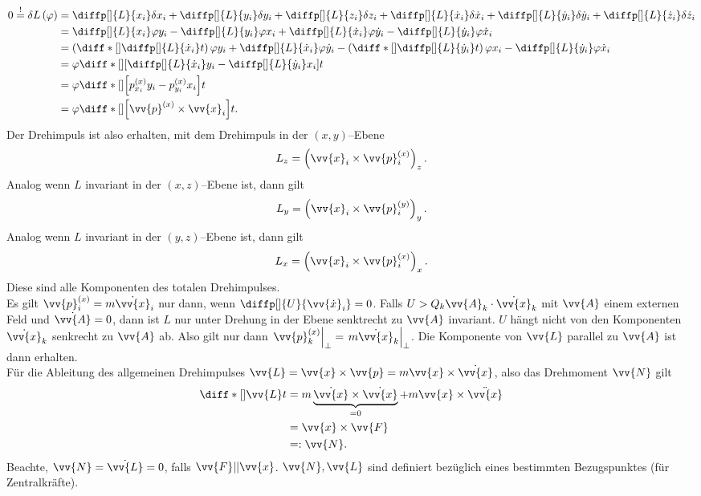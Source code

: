 \documentclass[a4paper,12pt]{article}
\numberwithin{equation}{section}
\begin{document}
\begin{align*}
        0\stackrel{!}{=}\delta L\left(\varphi \right)&=\diffp[]{L}{x_i}\delta x_i+\diffp[]{L}{y_i}\delta y_i+\diffp[]{L}{z_i}\delta z_i+\diffp[]{L}{\dot{x}_i}\delta \dot{x}_i +\diffp[]{L}{\dot{y}_i}\delta \dot{y}_i+\diffp[]{L}{\dot{z}_i}\delta \dot{z}_i\\
                                                     &=\diffp[]{L}{x_i}\varphi y_i-\diffp[]{L}{y_i}\varphi x_i+\diffp[]{L}{\dot{x}_i}\varphi \dot{y}_i-\diffp[]{L}{\dot{y}_i}\varphi \dot{x}_i\\
                                                     &=\left(\diff*[]{\diffp[]{L}{\dot{x}_i}}{t}\right)\varphi y_i+\diffp[]{L}{\dot{x}_i}\varphi \dot{y}_i-\left(\diff*[]{\diffp[]{L}{\dot{y}_i}}{t}\right)\varphi x_i-\diffp[]{L}{\dot{y}_i}\varphi \dot{x}_i\\
                                                     &=\varphi \diff*[]{\left[\diffp[]{L}{\dot{x}_i}y_i-\diffp[]{L}{\dot{y}_i}x_i\right]}{t}\\
                                                     &=\varphi \diff*[]{\left[p^{(x)}_{x_i}y_i-p^{(x)}_{y_i}x_i\right]}{t}\\
                                                     &=\varphi \diff*[]{\left[\vv{p}^{(x)}\times \vv{x}_i\right]}{t}
.\end{align*}
Der Drehimpuls ist also erhalten, mit dem Drehimpuls in der $(x,y)$--Ebene
\[ 
        L_z=\left(\vv{x}_i\times \vv{p}_i^{(x)}\right)_z
.\] 
Analog wenn $L$ invariant in der $(x,z)$--Ebene ist, dann gilt
\[ 
        L_y=\left(\vv{x}_i\times \vv{p}_i^{(y)}\right)_y
.\] 
Analog wenn $L$ invariant in der $(y,z)$--Ebene ist, dann gilt
\[ 
        L_x=\left(\vv{x}_i\times \vv{p}_i^{(x)}\right)_x
.\] 
Diese sind alle Komponenten des totalen Drehimpulses.\\\indent
Es gilt $\vv{p}_i^{(x)}=m\dot{\vv{x}}_i$ nur dann, wenn $\diffp[]{U}{\vv{\dot{x}}_i}=0$. Falls $U>Q_k\vv{A}_k\cdot \dot{\vv{x}}_k$ mit $\vv{A}$ einem externen Feld und $\dot{\vv{A}}=0$, dann ist $L$ nur unter Drehung in der Ebene senktrecht zu $\vv{A}$ invariant. $U$ hängt nicht von den Komponenten $\dot{\vv{x}}_k$ senkrecht zu $\vv{A}$ ab. Also gilt nur dann $\left.\vv{p}_k^{(x)}\right|_\perp=\left.m\dot{\vv{x}}_k\right|_\perp$. Die Komponente von $\vv{L}$ parallel zu $\vv{A}$ ist dann erhalten.\\\indent
Für die Ableitung des allgemeinen Drehimpulses $\vv{L}=\vv{x}\times \vv{p}=m\vv{x}\times \dot{\vv{x}}$, also das Drehmoment $\vv{N}$ gilt
\begin{align*}
        \diff*[]{\vv{L}}{t}&=m \underbrace{\dot{\vv{x}}\times \dot{\vv{x} }}_{=0}+m\vv{x}\times \ddot{\vv{x}}\\
                           &=\vv{x}\times \vv{F}\\
                           &=:\vv{N}
.\end{align*} 
Beachte, $\vv{N}=\dot{\vv{L}}=0$, falls $\vv{F}| | \vv{x}$. $\vv{N},\vv{L}$ sind definiert bezüglich eines bestimmten Bezugspunktes (für Zentralkräfte). 
\end{document}

